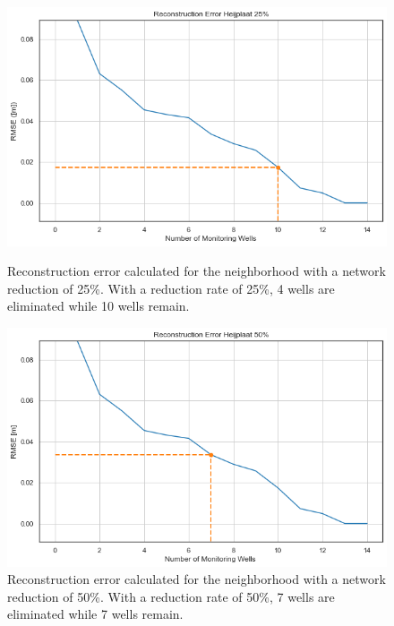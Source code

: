 \begin{figure}[htbp]
    \centering
    \begin{minipage}{0.45\linewidth}
        \includegraphics[width=\linewidth]{25heij.png}
        \caption{Reconstruction error calculated for the neighborhood with a network reduction of 25\%. With a reduction rate of 25\%, 4 wells are eliminated while 10 wells remain.}
        \label{fig:first-figure}
    \end{minipage}
    \hfill
    \begin{minipage}{0.45\linewidth}
        \includegraphics[width=\linewidth]{50heij.png}
        \caption{Reconstruction error calculated for the neighborhood with a network reduction of 50\%. With a reduction rate of 50\%, 7 wells are eliminated while 7 wells remain.}
        \label{fig:second-figure}
    \end{minipage}
\end{figure}


